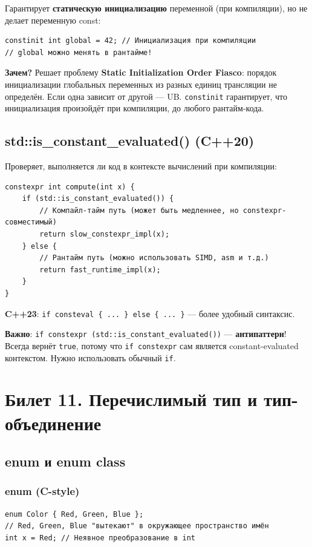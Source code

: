 \documentclass[12pt,a4paper]{article}
\begin{document}
Гарантирует \textbf{статическую инициализацию} переменной (при компиляции), но не делает переменную const:
\begin{lstlisting}
constinit int global = 42; // Инициализация при компиляции
// global можно менять в рантайме!
\end{lstlisting}

\textbf{Зачем?} Решает проблему \textbf{Static Initialization Order Fiasco}: порядок инициализации глобальных переменных из разных единиц трансляции не определён. Если одна зависит от другой --- UB. \texttt{constinit} гарантирует, что инициализация произойдёт при компиляции, до любого рантайм-кода.

\subsection{std::is\_constant\_evaluated() (C++20)}

Проверяет, выполняется ли код в контексте вычислений при компиляции:
\begin{lstlisting}
constexpr int compute(int x) {
    if (std::is_constant_evaluated()) {
        // Компайл-тайм путь (может быть медленнее, но constexpr-совместимый)
        return slow_constexpr_impl(x);
    } else {
        // Рантайм путь (можно использовать SIMD, asm и т.д.)
        return fast_runtime_impl(x);
    }
}
\end{lstlisting}

\textbf{C++23}: \texttt{if consteval \{ ... \} else \{ ... \}} --- более удобный синтаксис.

\textbf{Важно}: \texttt{if constexpr (std::is\_constant\_evaluated())} --- \textbf{антипаттерн}! Всегда вернёт \texttt{true}, потому что \texttt{if constexpr} сам является constant-evaluated контекстом. Нужно использовать обычный \texttt{if}.

\section{Билет 11. Перечислимый тип и тип-объединение}

\subsection{enum и enum class}

\subsubsection{enum (C-style)}
\begin{lstlisting}
enum Color { Red, Green, Blue };
// Red, Green, Blue "вытекают" в окружающее пространство имён
int x = Red; // Неявное преобразование в int
\end{lstlisting}
\end{document}
